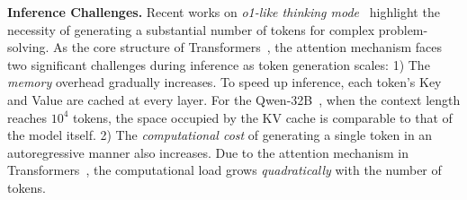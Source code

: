 \textbf{Inference Challenges.}
Recent works on \textit{o1-like thinking mode}~\citep{arxiv24_o1_study} 
highlight the necessity of generating a substantial number of tokens for complex problem-solving.
As the core structure of Transformers~\citep{nips17_transformer}, the attention mechanism faces two significant challenges during inference as token generation scales:
1) The \textit{memory} overhead gradually increases. 
To speed up inference, each token's Key and Value are cached at every layer. 
For the Qwen-32B~\citep{arxiv24_qwen2_5}, when the context length reaches $10^4$ tokens, the space occupied by the KV cache is comparable to that of the model itself.
2) The \textit{computational cost} of generating a single token in an autoregressive manner also increases. 
Due to the attention mechanism in Transformers~\citep{nips17_transformer}, the computational load grows \textit{quadratically} with the number of tokens.
